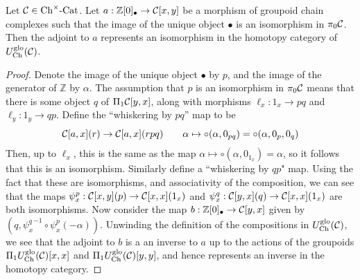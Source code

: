 \documentclass[12pt]{amsart}
\begin{document}
\begin{lemma}\label{lem:all-0-cells-isomorphisms}
	Let $\mathcal{C} \in {{{\mathrm{Ch}}}^{\times}\text{-}\mathrm{Cat}}$. Let $a : \mathbb{Z}[0]_\bullet \to \mathcal{C}[x,y]$ be a morphism of groupoid chain complexes such that the image of the unique object $\bullet$ is an isomorphism in $\pi_0\mathcal{C}$. 
	Then the adjoint to $a$ represents an isomorphism in the homotopy category of ${U^{\mathrm{glo}}_\mathrm{Ch}}(\mathcal{C})$.
\end{lemma}
\begin{proof}
	Denote the image of the unique object $\bullet $ by $p$, and the image of the generator of $\mathbb{Z}$ by $\alpha$. 
	The assumption that $p$ is an isomorphism in $\pi_0\mathcal{C}$ means that there is some object $q$ of $\Pi_1\mathcal{C}[y,x]$, along with morphisms
	$\ell_x: 1_x \to pq$ and $\ell_y: 1_y \to qp$. 
	Define the ``whiskering by $pq$'' map to be
	$$\mathcal{C}[a,x](r) \to \mathcal{C}[a,x](rpq) \quad \quad \alpha \mapsto \circ(\alpha, 0_{pq}) = \circ (\alpha, 0_p,0_q)$$
	Then, up to $\ell_x$, this is the same as the map $\alpha \mapsto \circ(\alpha, 0_{1_x}) = \alpha$, so it follows that this is an isomorphism.
	Similarly define a ``whiskering by $qp$" map.
	Using the fact that these are isomorphisms, and associativity of the composition, we can see that the maps $\psi^p_{x}: \mathcal{C}[x,y](p) \to \mathcal{C}[x,x](1_x)$ and $\psi^q_x: \mathcal{C}[y,x](q) \to \mathcal{C}[x,x](1_x)$ are both isomorphisms. 
	Now consider the map $b: \mathbb{Z}[0]_\bullet \to \mathcal{C}[y,x]$ given by $(q, {\psi^q_x}^{-1} \circ \psi^p_x (-\alpha))$. 
	Unwinding the definition of the compositions in ${U^{\mathrm{glo}}_\mathrm{Ch}}(\mathcal{C})$, we see that the adjoint to $b$ is a an inverse to $a$ up to the actions of the groupoids $\Pi_1{U^{\mathrm{glo}}_\mathrm{Ch}}(\mathcal{C})[x,x]$ and $\Pi_1 {U^{\mathrm{glo}}_\mathrm{Ch}}(\mathcal{C})[y,y]$, and hence represents an inverse in the homotopy category. 
\end{proof}
\end{document}
